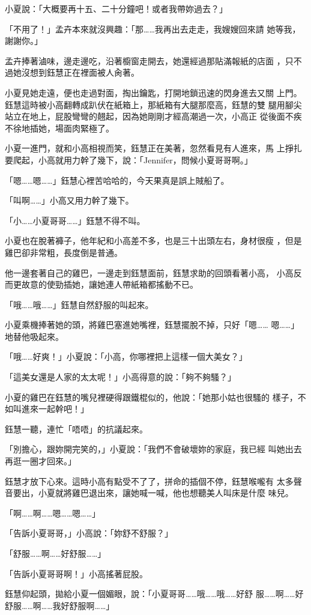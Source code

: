小夏說：「大概要再十五、二十分鐘吧！或者我帶妳過去？」

「不用了！」孟卉本來就沒興趣：「那……我再出去走走，我嫂嫂回來請
她等我，謝謝你。」

孟卉捧著滷味，邊走邊吃，沿著櫥窗走開去，她還經過那貼滿報紙的店面
，只不過她沒想到鈺慧正在裡面被人肏著。

小夏見她走遠，便也走過對面，掏出鑰匙，打開地鎖迅速的閃身進去又關
上門。鈺慧這時被小高翻轉成趴伏在紙箱上，那紙箱有大腿那麼高，鈺慧的雙
腿用腳尖站立在地上，屁股彎彎的翹起，因為她剛剛才經高潮過一次，小高正
從後面不疾不徐地插她，場面肉緊極了。

小夏一進門，就和小高相視而笑，鈺慧正在美著，忽然看見有人進來，馬
上掙扎要爬起，小高就用力幹了幾下，說：「Jennifer，問候小夏哥哥啊。」

「嗯……嗯……」鈺慧心裡苦哈哈的，今天果真是誤上賊船了。

「叫啊……」小高又用力幹了幾下。

「小……小夏哥哥……」鈺慧不得不叫。

小夏也在脫著褲子，他年紀和小高差不多，也是三十出頭左右，身材很瘦
，但是雞巴卻非常粗，長度倒是普通。

他一邊套著自己的雞巴，一邊走到鈺慧面前，鈺慧求助的回頭看著小高，
小高反而更故意的使勁插她，讓她連人帶紙箱都搖動不已。

「哦……哦……」鈺慧自然舒服的叫起來。

小夏乘機捧著她的頭，將雞巴塞進她嘴裡，鈺慧擺脫不掉，只好「嗯……
嗯……」地替他吸起來。

「哦……好爽！」小夏說：「小高，你哪裡把上這樣一個大美女？」

「這美女還是人家的太太呢！」小高得意的說：「夠不夠騷？」

小夏的雞巴在鈺慧的嘴兒裡硬得跟鐵棍似的，他說：「她那小姑也很騷的
樣子，不如叫進來一起幹吧！」

鈺慧一聽，連忙「唔唔」的抗議起來。

「別擔心，跟妳開完笑的，」小夏說：「我們不會破壞妳的家庭，我已經
叫她出去再逛一圈才回來。」

鈺慧才放下心來。這時小高有點受不了了，拼命的插個不停，鈺慧喉嚨有
太多聲音要出，小夏就將雞巴退出來，讓她喊一喊，他也想聽美人叫床是什麼
味兒。

「啊……啊……嗯……嗯……」

「告訴小夏哥哥，」小高說：「妳舒不舒服？」

「舒服……啊……好舒服……」

「告訴小夏哥哥啊！」小高搖著屁股。

鈺慧仰起頭，拋給小夏一個媚眼，說：「小夏哥哥……哦……哦……好舒
服……啊……好舒服……啊……我好舒服啊……」

